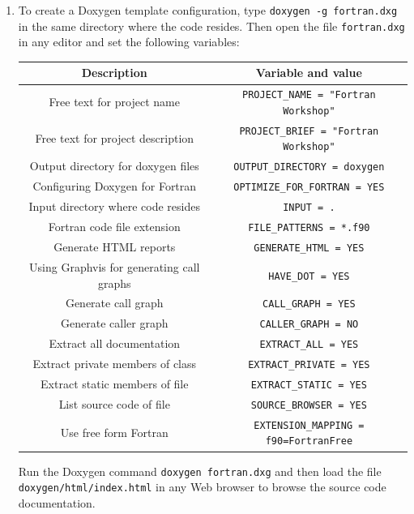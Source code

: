 \documentclass[12pt]{article}
\begin{document}
\begin{enumerate}
\begin{enumerate}
\end{enumerate}
\item To create a Doxygen template configuration, type \texttt{doxygen -g fortran.dxg} in the same
directory where the code resides. Then open the file \texttt{fortran.dxg} in any editor and set the 
following variables:
\begin{center}
\begin{tabular}{| c | c |} \hline
{\bf Description} & {\bf Variable and value} \\ \hline
Free text for project name & \texttt{PROJECT\_NAME = "Fortran Workshop"} \\ \hline
Free text for project description & \texttt{PROJECT\_BRIEF = "Fortran Workshop"} \\ \hline
Output directory for doxygen files & \texttt{OUTPUT\_DIRECTORY = doxygen} \\ \hline
Configuring Doxygen for Fortran & \texttt{OPTIMIZE\_FOR\_FORTRAN = YES} \\ \hline
Input directory where code resides & \texttt{INPUT = .} \\ \hline
Fortran code file extension & \texttt{FILE\_PATTERNS = *.f90} \\ \hline
Generate HTML reports & \texttt{GENERATE\_HTML = YES} \\ \hline
Using Graphvis for generating call graphs & \texttt{HAVE\_DOT = YES} \\ \hline
Generate call graph & \texttt{CALL\_GRAPH = YES} \\ \hline
Generate caller graph & \texttt{CALLER\_GRAPH = NO} \\ \hline
Extract all documentation & \texttt{EXTRACT\_ALL = YES} \\ \hline
Extract private members of class & \texttt{EXTRACT\_PRIVATE = YES} \\ \hline
Extract static members of file & \texttt{EXTRACT\_STATIC = YES} \\ \hline
List source code of file & \texttt{SOURCE\_BROWSER = YES} \\ \hline
Use free form Fortran & \texttt{EXTENSION\_MAPPING = f90=FortranFree} \\ \hline
\end{tabular}
\end{center}
Run the Doxygen command \texttt{doxygen fortran.dxg} and then load the file \newline
\texttt{doxygen/html/index.html} in any Web browser to browse the source code documentation.
\begin{enumerate}

\end{enumerate}
\end{enumerate}
\end{document}
